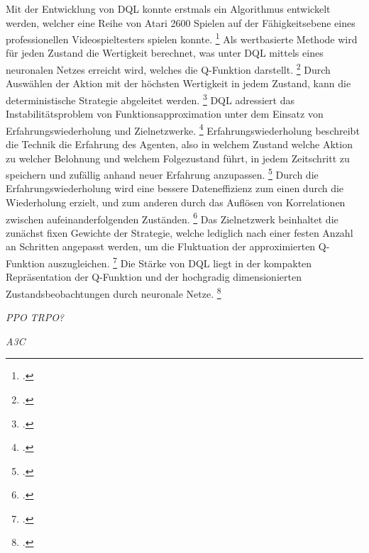 Mit der Entwicklung von DQL konnte erstmals ein Algorithmus entwickelt werden, welcher eine Reihe von Atari 2600 Spielen auf der Fähigkeitsebene eines professionellen Videospieltesters spielen konnte. \footcite[Vgl.][S. 6]{Arulkumaran.2017}
Als wertbasierte Methode wird für jeden Zustand die Wertigkeit berechnet, was unter DQL mittels eines neuronalen Netzes erreicht wird, welches die Q-Funktion darstellt. \footcite[Vgl.][S. 4]{Huang.2017}
Durch Auswählen der Aktion mit der höchsten Wertigkeit in jedem Zustand, kann die deterministische Strategie abgeleitet werden. \footcite[Vgl.][S. 4]{Huang.2017}
DQL adressiert das Instabilitätsproblem von Funktionsapproximation unter dem Einsatz von Erfahrungswiederholung und Zielnetzwerke. \footcite[Vgl.][S. 7]{Arulkumaran.2017}
Erfahrungswiederholung beschreibt die Technik die Erfahrung des Agenten, also in welchem Zustand welche Aktion zu welcher Belohnung und welchem Folgezustand führt, in jedem Zeitschritt zu speichern und zufällig anhand neuer Erfahrung anzupassen. \footcite[Vgl.][S. 4]{Mnih.2013}
Durch die Erfahrungswiederholung wird eine bessere Dateneffizienz zum einen durch die Wiederholung erzielt, und zum anderen durch das Auflösen von Korrelationen zwischen aufeinanderfolgenden Zuständen. \footcite[Vgl.][S. 4f.]{Mnih.2013}
Das Zielnetzwerk beinhaltet die zunächst fixen Gewichte der Strategie, welche lediglich nach einer festen Anzahl an Schritten angepasst werden, um die Fluktuation der approximierten Q-Funktion auszugleichen. \footcite[Vgl.][S. 7]{Arulkumaran.2017}
Die Stärke von DQL liegt in der kompakten Repräsentation der Q-Funktion und der hochgradig dimensionierten Zustandsbeobachtungen durch neuronale Netze. \footcite[Vgl.][S. 7]{Arulkumaran.2017}

\textit{PPO}
\textit{TRPO?}



\textit{A3C}


